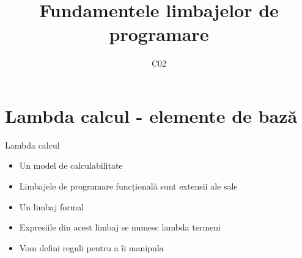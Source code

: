 \documentclass[xcolor=pdftex,romanian,colorlinks]{beamer}
\title[FLP]{Fundamentele limbajelor de programare}
\subtitle{C02}
\date{}
\begin{document}
\begin{frame}
  \titlepage
\end{frame}

\section{\color{section-color} Lambda calcul - elemente de bază}

\begin{frame}{Lambda calcul}

\begin{itemize}
	\medskip
	\item Un model de calculabilitate
	\medskip
	\item Limbajele de programare funcțională sunt extensii ale sale
	\medskip
	\item Un limbaj formal
	\medskip
	\item Expresiile din acest limbaj se numesc \alert{lambda termeni}
	\medskip
	\item Vom defini reguli pentru a îi manipula
\end{itemize}
\end{frame}
\end{document}

